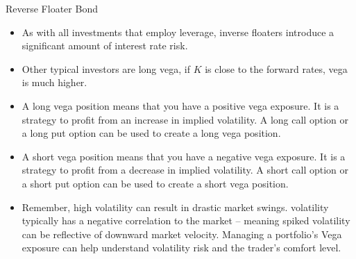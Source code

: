 \documentclass{beamer}
\begin{document}
\begin{frame}{Reverse Floater Bond}
	\begin{itemize}
		\item As with all investments that employ leverage, inverse floaters introduce a significant amount of interest rate risk. 
		\item Other typical investors are long vega, if $K$ is close to the forward rates, vega is much higher.
		\item A long vega position means that you have a positive vega exposure. It is a strategy to profit from an increase in implied volatility. A long call option or a long put option can be used to create a long vega position. 
		\item A short vega position means that you have a negative vega exposure. It is a strategy to profit from a decrease in implied volatility. A short call option or a short put option can be used to create a short vega position. 
		\item Remember, high volatility can result in drastic market swings. volatility typically has a negative correlation to the market – meaning spiked volatility can be reflective of downward market velocity. Managing a portfolio's Vega exposure can help understand volatility risk and the trader's comfort level.
	\end{itemize}
\end{frame}
%
%
%
\end{document}
